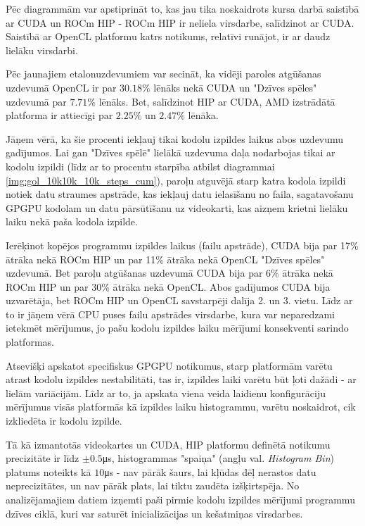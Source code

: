Pēc diagrammām var apstiprināt to, kas jau tika noskaidrots kursa darbā
saistībā ar CUDA un ROCm HIP - ROCm HIP ir neliela virsdarbe, salīdzinot ar
CUDA.\cite{kursa-darbs} Saistībā ar OpenCL platformu katrs notikums, relatīvi
runājot, ir ar daudz lielāku virsdarbi.

Pēc jaunajiem etalonuzdevumiem var secināt, ka vidēji paroles atgūšanas
uzdevumā OpenCL ir par \(30.18\%\) lēnāks nekā CUDA un "Dzīves spēles" uzdevumā
par \(7.71\%\) lēnāks. Bet, salīdzinot HIP ar CUDA, AMD izstrādātā platforma ir
attiecīgi par \(2.25\%\) un \(2.47\%\) lēnāka.

Jāņem vērā, ka šie procenti iekļauj tikai kodolu izpildes laikus abos uzdevumu
gadījumos. Lai gan "Dzīves spēlē" lielākā uzdevuma daļa nodarbojas tikai ar
kodolu izpildi (līdz ar to procentu starpība atbilst diagrammai
\ref{img:gol_10k10k_10k_steps_cum}), paroļu atguvējā starp katra kodola izpildi
notiek datu straumes apstrāde, kas iekļauj datu ielasīšanu no faila,
sagatavošanu GPGPU kodolam un datu pārsūtīšanu uz videokarti, kas aizņem
krietni lielāku laiku nekā paša kodola izpilde.

Ierēķinot kopējos programmu izpildes laikus (failu apstrāde), CUDA bija par
17\% ātrāka nekā ROCm HIP un par 11\% ātrāka nekā OpenCL "Dzīves spēles"
uzdevumā. Bet paroļu atgūšanas uzdevumā CUDA bija par 6\% ātrāka nekā ROCm HIP
un par 30\% ātrāka nekā OpenCL. Abos gadījumos CUDA bija uzvarētāja, bet ROCm
HIP un OpenCL savstarpēji dalīja 2. un 3. vietu. Līdz ar to ir jāņem vērā CPU
puses failu apstrādes virsdarbe, kura var neparedzami ietekmēt mērījumus, jo
pašu kodolu izpildes laiku mērījumi konsekventi sarindo platformas.

Atsevišķi apskatot specifiskus GPGPU notikumus, starp platformām varētu atrast
kodolu izpildes nestabilitāti, tas ir, izpildes laiki varētu būt ļoti dažādi -
ar lielām variācijām. Līdz ar to, ja apskata viena veida laidienu konfigurāciju
mērījumus visās platformās kā izpildes laiku histogrammu, varētu noskaidrot, cik
izkliedēta  ir kodolu izpilde.

Tā kā izmantotās videokartes un CUDA, HIP platformu definētā notikumu
precizitāte ir līdz \(\pm0.5\)\si{\micro\second}, histogrammas "spaiņa" (angļu
val. \textit{Histogram Bin}) platums noteikts kā \(10\)\si{\micro\second} - nav
pārāk šaurs, lai kļūdas dēļ nerastos datu neprecizitātes, un nav pārāk plats,
lai tiktu zaudēta izšķirtspēja. \cite{Freedman1981} No analizējamajiem datiem
izņemti paši pirmie kodolu izpildes mērījumi programmu dzīves ciklā, kuri var
saturēt inicializācijas un kešatmiņas virsdarbes.

